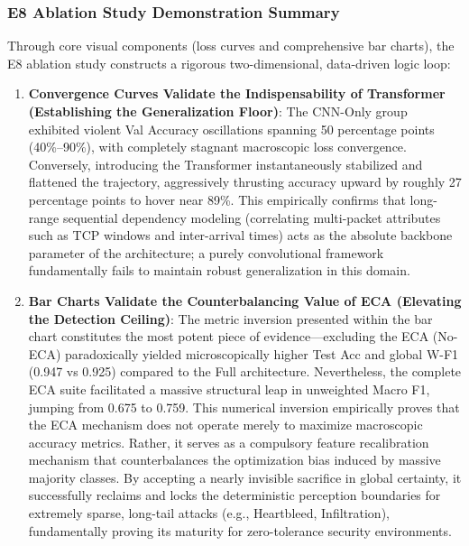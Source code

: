 \documentclass[sigconf]{acmart}
\begin{document}
\subsubsection*{E8 Ablation Study Demonstration Summary}

Through core visual components (loss curves and comprehensive bar charts), the E8 ablation study constructs a rigorous two-dimensional, data-driven logic loop:
\begin{enumerate}
\item \textbf{Convergence Curves Validate the Indispensability of Transformer (Establishing the Generalization Floor)}: 
The CNN-Only group exhibited violent Val Accuracy oscillations spanning 50 percentage points (40\%--90\%), with completely stagnant macroscopic loss convergence. Conversely, introducing the Transformer instantaneously stabilized and flattened the trajectory, aggressively thrusting accuracy upward by roughly 27 percentage points to hover near 89\%. This empirically confirms that long-range sequential dependency modeling (correlating multi-packet attributes such as TCP windows and inter-arrival times) acts as the absolute backbone parameter of the architecture; a purely convolutional framework fundamentally fails to maintain robust generalization in this domain.
\item \textbf{Bar Charts Validate the Counterbalancing Value of ECA (Elevating the Detection Ceiling)}: 
The metric inversion presented within the bar chart constitutes the most potent piece of evidence---excluding the ECA (No-ECA) paradoxically yielded microscopically higher Test Acc and global W-F1 (0.947 vs 0.925) compared to the Full architecture. Nevertheless, the complete ECA suite facilitated a massive structural leap in unweighted Macro F1, jumping from 0.675 to 0.759. This numerical inversion empirically proves that the ECA mechanism does not operate merely to maximize macroscopic accuracy metrics. Rather, it serves as a compulsory feature recalibration mechanism that counterbalances the optimization bias induced by massive majority classes. By accepting a nearly invisible sacrifice in global certainty, it successfully reclaims and locks the deterministic perception boundaries for extremely sparse, long-tail attacks (e.g., Heartbleed, Infiltration), fundamentally proving its maturity for zero-tolerance security environments.
\end{enumerate}
\end{document}

